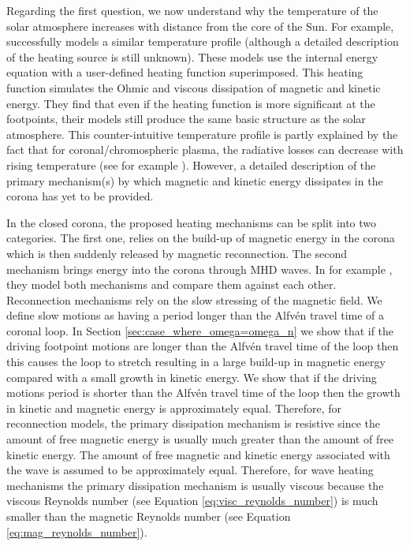 Regarding the first question, we now understand why the temperature of the solar atmosphere increases with distance from the core of the Sun. For example, \citet{Martens2010} successfully models a similar temperature profile  (although a detailed description of the heating source is still unknown). These models use the internal energy equation with a user-defined heating function superimposed. This heating function simulates the Ohmic and viscous dissipation of magnetic and kinetic energy. They find that even if the heating function is more significant at the footpoints, their models still produce the same basic structure as the solar atmosphere. This counter-intuitive temperature profile is partly explained by the fact that for coronal/chromospheric plasma, the radiative losses can decrease with rising temperature (see for example \citealt{Klimchuck2008}).
However, a detailed description of the primary mechanism(s) by which magnetic and kinetic energy dissipates in the corona has yet to be provided.

In the closed corona, the proposed heating mechanisms can be split into two categories. The first one, relies on the build-up of magnetic energy in the corona which is then suddenly released by magnetic reconnection. The second mechanism brings energy into the corona through MHD waves. In for example \citet{vanBallegooijen2011}, \citet{Howson2020} they model both mechanisms and compare them against each other. Reconnection mechanisms rely on the slow stressing of the magnetic field. We define slow motions as having a period longer than the Alfv\'en travel time of a coronal loop. In Section \ref{sec:case_where_omega=omega_n} we show that if the driving footpoint motions are longer than the Alfv\'en travel time of the loop then this causes the loop to stretch resulting in a large build-up in magnetic energy compared with a small growth in kinetic energy. We show that if the driving motions period is shorter than the Alfv\'en travel time of the loop then the growth in kinetic and magnetic energy is approximately equal. Therefore, for reconnection models, the primary dissipation mechanism is resistive since the amount of free magnetic energy is usually much greater than the amount of free kinetic energy. The amount of free magnetic and kinetic energy associated with the wave is assumed to be approximately equal. Therefore, for wave heating mechanisms the primary dissipation mechanism is usually viscous because the viscous Reynolds number (see Equation \ref{eq:visc_reynolds_number}) is much smaller than the magnetic Reynolds number (see Equation \ref{eq:mag_reynolds_number}).


